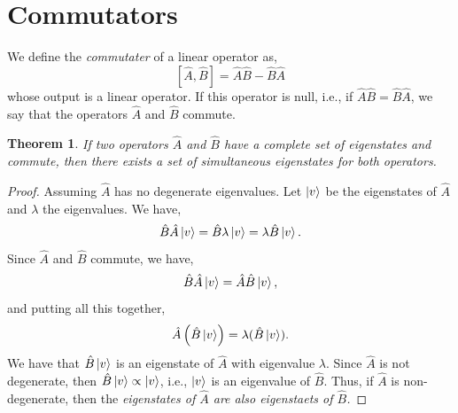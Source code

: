 \documentclass{book}
\newtheorem*{theorem}{Theorem}
\begin{document}
\section{Commutators}
We define the \textit{commutater} of a linear operator as,
\begin{equation}
	\left[\hat{A},\hat{B}\right] = \hat{A}\hat{B} - \hat{B}\hat{A}
\end{equation}
whose output is a linear operator. If this operator is null, i.e., if $\hat{A}\hat{B} = \hat{B}\hat{A}$, we say that the operators $\hat{A}$ and $\hat{B}$ commute.
\begin{theorem}
	If two operators $\hat{A}$ and $\hat{B}$ have a complete set of eigenstates and commute, then there exists a set of simultaneous eigenstates for both operators.
\end{theorem}
\begin{proof}
	Assuming $\hat{A}$ has no degenerate eigenvalues. Let $\ket{v}$ be the eigenstates of $\hat{A}$ and $\lambda$ the eigenvalues. We have,
	\begin{equation}
		\hat{B}\hat{A}\ket{v} = \hat{B}\lambda\ket{v} = \lambda\hat{B}\ket{v}.
	\end{equation}
	Since $\hat{A}$ and $\hat{B}$ commute, we have,
	\begin{equation}
		\hat{B}\hat{A}\ket{v} = \hat{A}\hat{B}\ket{v},
	\end{equation}
	and putting all this together,
	\begin{equation}
		\hat{A}\left(\hat{B}\ket{v}\right) = \lambda(\hat{B}\ket{v}). \label{eq:ajhk}
	\end{equation}
	We have that $\hat{B}\ket{v}$ is an eigenstate of $\hat{A}$ with eigenvalue $\lambda$. Since $\hat{A}$ is not degenerate, then $\hat{B}\ket{v} \propto \ket{v}$, i.e., $\ket{v}$ is an eigenvalue of $\hat{B}$. Thus, if $\hat{A}$ is non-degenerate, then the \textit{eigenstates of $\hat{A}$ are also eigenstaets of $\hat{B}$.}
\end{proof}
\end{document}
